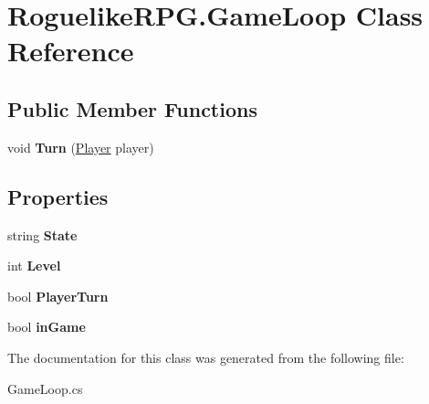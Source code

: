 \hypertarget{class_roguelike_r_p_g_1_1_game_loop}{}\section{Roguelike\+R\+P\+G.\+Game\+Loop Class Reference}
\label{class_roguelike_r_p_g_1_1_game_loop}
\subsection*{Public Member Functions}
\begin{DoxyCompactItemize}
\item 
\mbox{\label{class_roguelike_r_p_g_1_1_game_loop_a26f21dbe2f4a8dbd6bb17cc48d68e0b0}} 
void {\bfseries Turn} (\mbox{\hyperlink{class_roguelike_r_p_g_1_1_player}{Player}} player)
\end{DoxyCompactItemize}
\subsection*{Properties}
\begin{DoxyCompactItemize}
\item 
\mbox{\label{class_roguelike_r_p_g_1_1_game_loop_aab86497d0428409f1d5b8412f8ac775a}} 
string {\bfseries State}
\item 
\mbox{\label{class_roguelike_r_p_g_1_1_game_loop_a636d816b0a16620f1776cbdaeadb9f6b}} 
int {\bfseries Level}
\item 
\mbox{\label{class_roguelike_r_p_g_1_1_game_loop_a3c9b1d3233dbdf14a47571667106ce73}} 
bool {\bfseries Player\+Turn}
\item 
\mbox{\label{class_roguelike_r_p_g_1_1_game_loop_ad53ffbdbf9f9780b9ae78bef180806fd}} 
bool {\bfseries in\+Game}
\end{DoxyCompactItemize}


The documentation for this class was generated from the following file\+:\begin{DoxyCompactItemize}
\item 
Game\+Loop.\+cs\end{DoxyCompactItemize}
